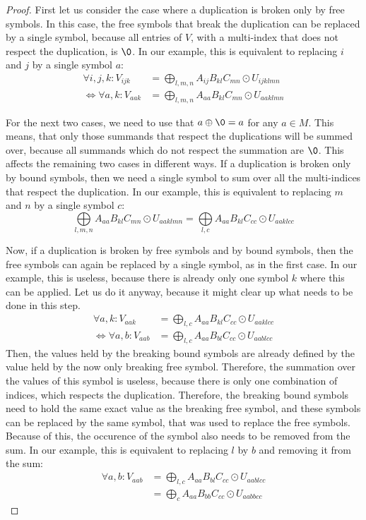 \begin{proof}
    First let us consider the case where a duplication is broken only by free symbols.
    In this case, the free symbols that break the duplication can be replaced by a single symbol,
    because all entries of $V$, with a multi-index that does not respect the duplication, is $\0$.
    In our example, this is equivalent to replacing $i$ and $j$ by a single symbol $a$:
    \begin{align*}
        \forall i,j,k: V_{ijk}    & = \bigoplus\limits_{l,m,n} A_{ij} B_{kl} C_{mn} \odot U_{ijklmn} \\
        \iff \forall a,k: V_{aak} & = \bigoplus\limits_{l,m,n} A_{aa} B_{kl} C_{mn} \odot U_{aaklmn}
    \end{align*}

    For the next two cases, we need to use that $a \oplus \0 = a$ for any $a \in M$.
    This means, that only those summands that respect the duplications will be summed over,
    because all summands which do not respect the summation are $\0$.
    This affects the remaining two cases in different ways.
    If a duplication is broken only by bound symbols, then we need a single symbol to sum over all the multi-indices that respect the duplication.
    In our example, this is equivalent to replacing $m$ and $n$ by a single symbol $c$:
    $$\bigoplus\limits_{l,m,n} A_{aa} B_{kl} C_{mn} \odot U_{aaklmn} = \bigoplus\limits_{l,c} A_{aa} B_{kl} C_{cc} \odot U_{aaklcc}$$

    Now, if a duplication is broken by free symbols and by bound symbols,
    then the free symbols can again be replaced by a single symbol, as in the first case.
    In our example, this is useless, because there is already only one symbol $k$ where this can be applied.
    Let us do it anyway, because it might clear up what needs to be done in this step.
    \begin{align*}
        \forall a,k: V_{aak}      & = \bigoplus\limits_{l,c} A_{aa} B_{kl} C_{cc} \odot U_{aaklcc} \\
        \iff \forall a,b: V_{aab} & = \bigoplus\limits_{l,c} A_{aa} B_{bl} C_{cc} \odot U_{aablcc}
    \end{align*}
    Then, the values held by the breaking bound symbols are already defined by the value held by the now only breaking free symbol.
    Therefore, the summation over the values of this symbol is useless, because there is only one combination of indices, which respects the duplication.
    Therefore, the breaking bound symbols need to hold the same exact value as the breaking free symbol,
    and these symbols can be replaced by the same symbol, that was used to replace the free symbols.
    Because of this, the occurence of the symbol also needs to be removed from the sum.
    In our example, this is equivalent to replacing $l$ by $b$ and removing it from the sum:
    \begin{align*}
        \forall a,b: V_{aab} & = \bigoplus\limits_{l,c} A_{aa} B_{bl} C_{cc} \odot U_{aablcc} \\
                             & = \bigoplus\limits_{c} A_{aa} B_{bb} C_{cc} \odot U_{aabbcc}
    \end{align*}


\end{proof}
